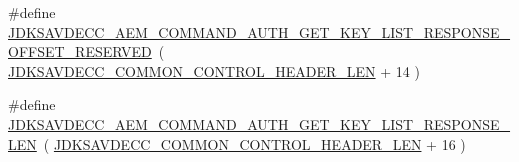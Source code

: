 \begin{DoxyCompactItemize}
\item 
\#define \hyperlink{group__command__auth__get__key__list__response_gac34c30ffeaf37c7057072f996929f1e6}{J\+D\+K\+S\+A\+V\+D\+E\+C\+C\+\_\+\+A\+E\+M\+\_\+\+C\+O\+M\+M\+A\+N\+D\+\_\+\+A\+U\+T\+H\+\_\+\+G\+E\+T\+\_\+\+K\+E\+Y\+\_\+\+L\+I\+S\+T\+\_\+\+R\+E\+S\+P\+O\+N\+S\+E\+\_\+\+O\+F\+F\+S\+E\+T\+\_\+\+R\+E\+S\+E\+R\+V\+ED}~( \hyperlink{group__jdksavdecc__avtp__common__control__header_gaae84052886fb1bb42f3bc5f85b741dff}{J\+D\+K\+S\+A\+V\+D\+E\+C\+C\+\_\+\+C\+O\+M\+M\+O\+N\+\_\+\+C\+O\+N\+T\+R\+O\+L\+\_\+\+H\+E\+A\+D\+E\+R\+\_\+\+L\+EN} + 14 )
\item 
\#define \hyperlink{group__command__auth__get__key__list__response_gaa154dd776017e4732496d47b22064ff0}{J\+D\+K\+S\+A\+V\+D\+E\+C\+C\+\_\+\+A\+E\+M\+\_\+\+C\+O\+M\+M\+A\+N\+D\+\_\+\+A\+U\+T\+H\+\_\+\+G\+E\+T\+\_\+\+K\+E\+Y\+\_\+\+L\+I\+S\+T\+\_\+\+R\+E\+S\+P\+O\+N\+S\+E\+\_\+\+L\+EN}~( \hyperlink{group__jdksavdecc__avtp__common__control__header_gaae84052886fb1bb42f3bc5f85b741dff}{J\+D\+K\+S\+A\+V\+D\+E\+C\+C\+\_\+\+C\+O\+M\+M\+O\+N\+\_\+\+C\+O\+N\+T\+R\+O\+L\+\_\+\+H\+E\+A\+D\+E\+R\+\_\+\+L\+EN} + 16 )
\end{DoxyCompactItemize}
